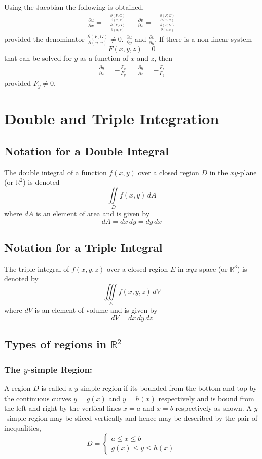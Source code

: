 \documentclass[14pt]{article}
\begin{document}
    Using the Jacobian the following is obtained,
    \begin{align*}
        \frac{\partial u}{\partial x}=-\frac{\frac{\partial(F, G)}{\partial (x, v)}}{\frac{\partial(F, G)}{\partial (u, v)}} &&
        \frac{\partial v}{\partial x}=-\frac{\frac{\partial(F, G)}{\partial (u, x)}}{\frac{\partial(F, G)}{\partial (u, v)}}
    \end{align*}
    provided the denominator $\frac{\partial(F, G)}{\partial (u, v)}\neq
    0$. $\frac{\partial u}{\partial y}$ and $\frac{\partial v}{\partial
    y}$. If there is a non linear system
    $$F(x,y,z)=0$$ that can be solved for $y$ as a function of $x$ and
    $z$, then
    \begin{align*}
        \frac{\partial y}{\partial x}=-\frac{F_x}{F_y} && \frac{\partial y}{\partial z}=-\frac{F_z}{F_y}
    \end{align*}
    provided $F_y\neq 0$. 
    \pagebreak
    \section{Double and Triple Integration}
    \subsection{Notation for a Double Integral}
    The double integral of a function $f(x,y)$ over a closed region $D$
    in the $xy$-plane (or $\mathbb{R}^2$) is denoted 
    $$\iint\limits_D f(x,y)\, dA$$ where $dA$ is an element of area and
    is given by
    $$dA=dx\, dy=dy\, dx$$
    \subsection{Notation for a Triple Integral}
    The triple integral of $f(x,y,z)$ over a closed region $E$ in
    $xyz$-space (or $\mathbb{R}^3$) is denoted by
    $$\iiint\limits_E f(x,y,z)\, dV$$ where $dV$ is an element of volume
    and is given by
    $$dV=dx\, dy\, dz$$
    \subsection{Types of regions in $\mathbb{R}^2$}
    \subsubsection{The $y$-simple Region:}
    A region $D$ is called a $y$-simple region if its bounded from the
    bottom and top by the continuous curves $y=g(x)$ and $y=h(x)$
    respectively and is bound from the left and right by the vertical
    lines $x=a$ and $x=b$ respectively as shown. A $y$-simple region may
    be sliced vertically and hence may be described by the pair of
    inequalities,
    $$D=\left\{\begin{array}{lr} a\leq x\leq b\\
        g(x)\leq y \leq h(x) \end{array}\right.$$
\end{document}

